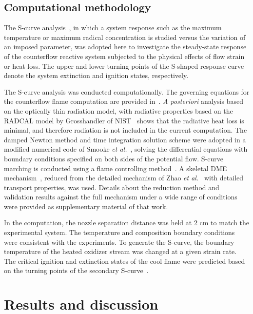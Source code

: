 \documentclass[review,3p,times]{elsarticle}
\begin{document}
\subsection{Computational methodology}

The S-curve analysis~\cite{lawbook}, in which a system response such as the maximum temperature or maximum radical concentration is studied versus the variation of an imposed parameter, was adopted here to investigate the steady-state response of the counterflow reactive system subjected to the physical effects of flow strain or heat loss.  The upper and lower turning points of the S-shaped response curve denote the system extinction and ignition states, respectively. 

The S-curve analysis was conducted computationally.  The governing equations for the counterflow flame computation are provided in~\cite{giovangigli87}.  \emph{A posteriori} analysis based on the optically thin radiation model, with radiative properties based on the RADCAL model by Grosshandler of NIST~\cite{grosshandler93} shows that the radiative heat loss is minimal, and therefore radiation is not included in the current computation.  The damped Newton method and time integration solution scheme were adopted in a modified numerical code of Smooke \emph{et al.}~\cite{smooke88}, solving the differential equations with boundary conditions specified on both sides of the potential flow.  S-curve marching is conducted using a flame controlling method~\cite{nishioka96}.  A skeletal DME mechanism~\cite{bhagatwala15}, reduced from the detailed mechanism of Zhao \emph{et al.}~\cite{zhao08} with detailed transport properties, was used.  \textcolor{Rev1}{Details about the reduction method and validation results against the full mechanism under a wide range of conditions were provided as supplementary material of that work.}

In the computation, the nozzle separation distance was held at 2 cm to match the experimental system.  The temperature and composition boundary conditions were consistent with the experiments.  To generate the S-curve, the boundary temperature of the heated oxidizer stream was changed at a given strain rate.  The critical ignition and extinction states of the cool flame were predicted based on the turning points of the secondary S-curve~\cite{law12,deng14}. 


\section{Results and discussion}
\end{document}
